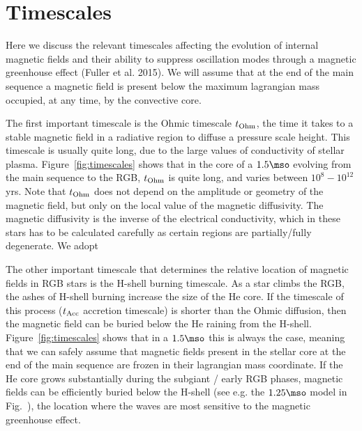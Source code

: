 \section{Timescales}
\label{time}
Here we discuss the relevant timescales affecting the evolution of internal magnetic fields and their ability to 
suppress oscillation modes through a magnetic greenhouse effect (Fuller et al. 2015).
We will assume that at the end of the main sequence a magnetic field is present below the maximum lagrangian mass occupied, at any time, by the convective core.

The first important timescale is the Ohmic timescale $t_{\rm Ohm}$, the time it takes to a stable magnetic field in a radiative region to diffuse a pressure scale height. This timescale is usually quite long, due to the large values of conductivity of stellar plasma. Figure~\ref{fig:timescales} shows that in the core of a $1.5\mso$ evolving from the main sequence to the RGB,  $t_{\rm Ohm}$ is quite long, and varies between $10^8-10^12$ yrs. Note that  $t_{\rm Ohm}$ does not depend on the amplitude or geometry of the magnetic field, but only on the local value of the magnetic diffusivity. The magnetic diffusivity is the inverse of the electrical conductivity,  which in these stars has to be calculated carefully as certain regions are partially/fully degenerate. We adopt

The other important timescale that determines the relative location of magnetic fields in  RGB stars is the H-shell burning timescale. As a star climbs the RGB, the ashes of H-shell burning increase the size of the He core. If the timescale of this process ($t_{\rm Acc}$ accretion timescale)  is shorter than the Ohmic diffusion, then the magnetic field can be buried below the He raining from the H-shell. Figure~\ref{fig:timescales} shows that in a $1.5\mso$ this is always the case, meaning that 
we can safely assume that magnetic fields present in the stellar core at the end of the main sequence are frozen in their lagrangian mass coordinate. If the He core grows substantially during the subgiant / early RGB phases, magnetic fields can be efficiently buried below the H-shell (see e.g. the $1.25\mso$ model in Fig.~\label{fig:DipoleHist}), the location where the waves are most sensitive to the magnetic greenhouse effect. 

